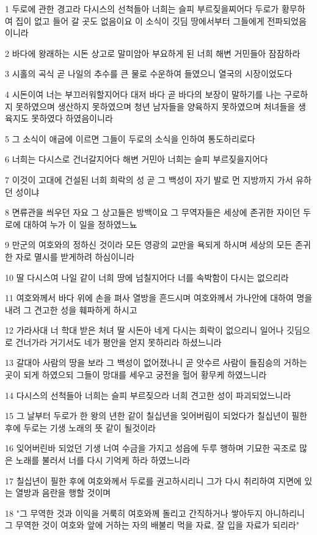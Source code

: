 \par 1 두로에 관한 경고라 다시스의 선척들아 너희는 슬피 부르짖을찌어다 두로가 황무하여 집이 없고 들어 갈 곳도 없음이요 이 소식이 깃딤 땅에서부터 그들에게 전파되었음이니라
\par 2 바다에 왕래하는 시돈 상고로 말미암아 부요하게 된 너희 해변 거민들아 잠잠하라
\par 3 시홀의 곡식 곧 나일의 추수를 큰 물로 수운하여 들였으니 열국의 시장이었도다
\par 4 시돈이여 너는 부끄러워할지어다 대저 바다 곧 바다의 보장이 말하기를 나는 구로하지 못하였으며 생산하지 못하였으며 청년 남자들을 양육하지 못하였으며 처녀들을 생육지도 못하였다 하였음이니라
\par 5 그 소식이 애굽에 이르면 그들이 두로의 소식을 인하여 통도하리로다
\par 6 너희는 다시스로 건너갈지어다 해변 거민아 너희는 슬피 부르짖을지어다
\par 7 이것이 고대에 건설된 너희 희락의 성 곧 그 백성이 자기 발로 먼 지방까지 가서 유하던 성이냐
\par 8 면류관을 씌우던 자요 그 상고들은 방백이요 그 무역자들은 세상에 존귀한 자이던 두로에 대하여 누가 이 일을 정하였느뇨
\par 9 만군의 여호와의 정하신 것이라 모든 영광의 교만을 욕되게 하시며 세상의 모든 존귀한 자로 멸시를 받게하려 하심이니라
\par 10 딸 다시스여 나일 같이 너희 땅에 넘칠지어다 너를 속박함이 다시는 없으리라
\par 11 여호와께서 바다 위에 손을 펴사 열방을 흔드시며 여호와께서 가나안에 대하여 명을 내려 그 견고한 성을 훼파하게 하시고
\par 12 가라사대 너 학대 받은 처녀 딸 시돈아 네게 다시는 희락이 없으리니 일어나 깃딤으로 건너가라 거기서도 네가 평안을 얻지 못하리라 하셨느니라
\par 13 갈대아 사람의 땅을 보라 그 백성이 없어졌나니 곧 앗수르 사람이 들짐승의 거하는 곳이 되게 하였으되 그들이 망대를 세우고 궁전을 헐어 황무케 하였느니라
\par 14 다시스의 선척들아 너희는 슬피 부르짖으라 너희 견고한 성이 파괴되었느니라
\par 15 그 날부터 두로가 한 왕의 년한 같이 칠십년을 잊어버림이 되었다가 칠십년이 필한 후에 두로는 기생 노래의 뜻 같이 될것이라
\par 16 잊어버린바 되었던 기생 너여 수금을 가지고 성읍에 두루 행하며 기묘한 곡조로 많은 노래를 불러서 너를 다시 기억케 하라 하였느니라
\par 17 칠십년이 필한 후에 여호와께서 두로를 권고하시리니 그가 다시 취리하여 지면에 있는 열방과 음란을 행할 것이며
\par 18 "그 무역한 것과 이익을 거룩히 여호와께 돌리고 간직하거나 쌓아두지 아니하리니 그 무역한 것이 여호와 앞에 거하는 자의 배불리 먹을 자료, 잘 입을 자료가 되리라"

